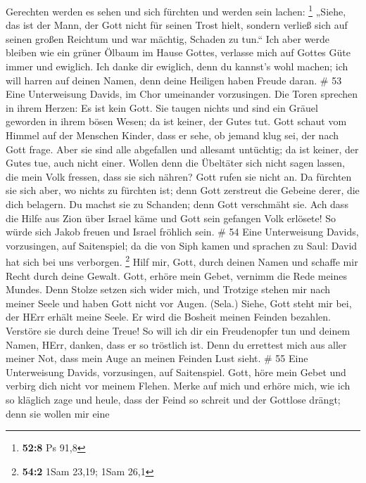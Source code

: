 Gerechten werden es sehen und sich fürchten und werden sein lachen:
\footnote{\textbf{52:8} Ps 91,8}  „Siehe, das ist der Mann,
der Gott nicht für seinen Trost hielt, sondern verließ sich auf seinen
großen Reichtum und war mächtig, Schaden zu tun.``  Ich
aber werde bleiben wie ein grüner Ölbaum im Hause Gottes, verlasse mich
auf Gottes Güte immer und ewiglich.  Ich danke dir
ewiglich, denn du kannst's wohl machen; ich will harren auf deinen
Namen, denn deine Heiligen haben Freude daran. \# 53  Eine
Unterweisung Davids, im Chor umeinander vorzusingen.  Die
Toren sprechen in ihrem Herzen: Es ist kein Gott. Sie taugen nichts und
sind ein Gräuel geworden in ihrem bösen Wesen; da ist keiner, der Gutes
tut.  Gott schaut vom Himmel auf der Menschen Kinder, dass
er sehe, ob jemand klug sei, der nach Gott frage.  Aber sie
sind alle abgefallen und allesamt untüchtig; da ist keiner, der Gutes
tue, auch nicht einer.  Wollen denn die Übeltäter sich nicht
sagen lassen, die mein Volk fressen, dass sie sich nähren? Gott rufen
sie nicht an.  Da fürchten sie sich aber, wo nichts zu
fürchten ist; denn Gott zerstreut die Gebeine derer, die dich belagern.
Du machst sie zu Schanden; denn Gott verschmäht sie.  Ach
dass die Hilfe aus Zion über Israel käme und Gott sein gefangen Volk
erlösete! So würde sich Jakob freuen und Israel fröhlich sein. \# 54
 Eine Unterweisung Davids, vorzusingen, auf Saitenspiel;
 da die von Siph kamen und sprachen zu Saul: David hat sich
bei uns verborgen. \footnote{\textbf{54:2} 1Sam 23,19; 1Sam 26,1}
 Hilf mir, Gott, durch deinen Namen und schaffe mir Recht
durch deine Gewalt.  Gott, erhöre mein Gebet, vernimm die
Rede meines Mundes.  Denn Stolze setzen sich wider mich, und
Trotzige stehen mir nach meiner Seele und haben Gott nicht vor Augen.
(Sela.)  Siehe, Gott steht mir bei, der HErr erhält meine
Seele.  Er wird die Bosheit meinen Feinden bezahlen.
Verstöre sie durch deine Treue!  So will ich dir ein
Freudenopfer tun und deinem Namen, HErr, danken, dass er so tröstlich
ist.  Denn du errettest mich aus aller meiner Not, dass mein
Auge an meinen Feinden Lust sieht. \# 55  Eine Unterweisung
Davids, vorzusingen, auf Saitenspiel.  Gott, höre mein Gebet
und verbirg dich nicht vor meinem Flehen.  Merke auf mich
und erhöre mich, wie ich so kläglich zage und heule,  dass
der Feind so schreit und der Gottlose drängt; denn sie wollen mir eine
